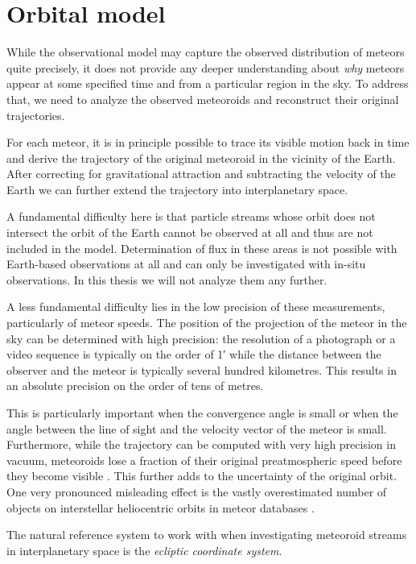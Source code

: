 \section{Orbital model} \label{mo}
    While the observational model may capture the observed distribution of meteors quite precisely,
    it does not provide any deeper understanding about \textit{why} meteors appear
    at some specified time and from a particular region in the sky.
    To address that, we need to analyze the observed meteoroids and reconstruct their original trajectories.

    For each meteor, it is in principle possible to trace its visible motion back in time
    and derive the trajectory of the original meteoroid in the vicinity of the Earth.
    After correcting for gravitational attraction and subtracting the velocity of the Earth
    we can further extend the trajectory into interplanetary space.

    A fundamental difficulty here is that particle streams whose orbit does not intersect
    the orbit of the Earth cannot be observed at all and thus are not included in the model.
    Determination of flux in these areas is not possible with Earth-based observations at all
    and can only be investigated with in-situ observations. In this thesis we will not analyze them any further.

    A less fundamental difficulty lies in the low precision of these measurements, particularly of meteor speeds.
    The position of the projection of the meteor in the sky can be determined with high precision:
    the resolution of a photograph or a video sequence is typically on the order of \ang{;1;}
    while the distance between the observer and the meteor is typically several hundred kilometres.
    This results in an absolute precision on the order of tens of metres.

    This is particularly important when the convergence angle is small \citep{ceplecha1987} or when the angle between
    the line of sight and the velocity vector of the meteor is small.
    Furthermore, while the trajectory can be computed with very high precision in vacuum,
    meteoroids lose a fraction of their original preatmospheric speed before they become visible \citep{vida+2018}.
    This further adds to the uncertainty of the original orbit.
    One very pronounced misleading effect is the vastly overestimated number of objects
    on interstellar heliocentric orbits in meteor databases \cite{hajdukovajr1994}.

    The natural reference system to work with when investigating meteoroid streams in interplanetary space
    is the \emph{ecliptic coordinate system}.

